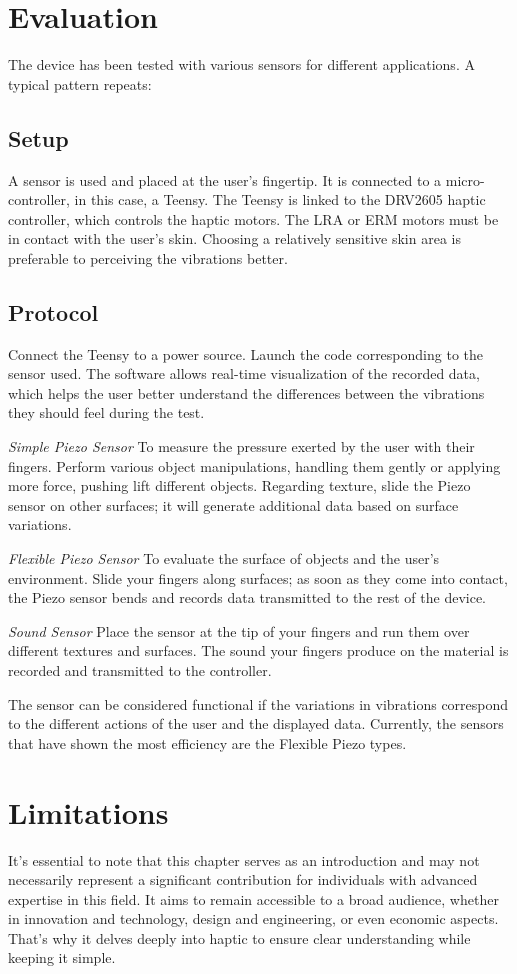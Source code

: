 \section{Evaluation}
The device has been tested with various sensors for different applications. A typical pattern repeats: 

\subsection{Setup}
A sensor is used and placed at the user's fingertip. It is connected to a micro-controller, in this case, a Teensy. The Teensy is linked to the DRV2605 haptic controller, which controls the haptic motors. The LRA or ERM motors must be in contact with the user's skin. Choosing a relatively sensitive skin area is preferable to perceiving the vibrations better.

\subsection{Protocol}
Connect the Teensy to a power source. Launch the code corresponding to the sensor used. The software allows real-time visualization of the recorded data, which helps the user better understand the differences between the vibrations they should feel during the test.

\textit{Simple Piezo Sensor}
To measure the pressure exerted by the user with their fingers. Perform various object manipulations, handling them gently or applying more force, pushing lift different objects. Regarding texture, slide the Piezo sensor on other surfaces; it will generate additional data based on surface variations.

\textit{Flexible Piezo Sensor}
To evaluate the surface of objects and the user's environment. Slide your fingers along surfaces; as soon as they come into contact, the Piezo sensor bends and records data transmitted to the rest of the device.

\textit{Sound Sensor}
Place the sensor at the tip of your fingers and run them over different textures and surfaces. The sound your fingers produce on the material is recorded and transmitted to the controller.

The sensor can be considered functional if the variations in vibrations correspond to the different actions of the user and the displayed data. Currently, the sensors that have shown the most efficiency are the Flexible Piezo types.

\section{Limitations}
It’s essential to note that this chapter serves as an introduction and may not necessarily represent a significant contribution for individuals with advanced expertise in this field. It aims to remain accessible to a broad audience, whether in innovation and technology, design and engineering, or even economic aspects. That's why it delves deeply into haptic to ensure clear understanding while keeping it simple.

